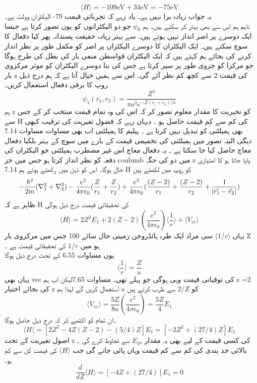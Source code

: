 \[\langle H \rangle =-109 \text{eV}+34 \text{eV}=-75\text{eV}\]
یہ جواب زیادہ برا نہیں ہے۔
یاد رہے کہ تجرباتی قیمت 79- الیکٹران وولٹ ہے۔\\
تاہم ہم اس سے بھی بہتر کر سکتے ہیں۔
ہم
\(\psi_{0}\)
جو دو الیکٹرانوں کو یوں تصور کرتا ہے جیسا ایک دوسرے پر اصر انداز نہیں ہوتے ہیں۔
سے بہتر زیادہ حقیقت پسندانہ پھر کیا دفعال کا سوچ سکتے ہیں۔
ایک الیکٹران کا دوسرے الیکٹران پر اصر کو مکمل طور پر نظر انداز کرنے کی بجائے ہم کہتے ہیں کہ ایک الیکٹران قواسطن منفی بار کی بطل کی طرح ہوگا جو مرکزا کو جزوی طور پر سپر کرتا ہے جس کی بنا دوسرے الیکٹران کو موثر مرکزوی بار z کی قیمت 2 سے کچھ کم نظر آئے گی۔ اس سے ہمیں خیال آتا ہے کہ ہم درج ذیل روپ کا برقی دفعال استعمال کریں۔
\[\psi_{1}(r_{1},r_{2})=\frac{Z^{3}}{\pi a^{3}e^{-Z(r_{1}+r_{2})/a}}\]
ہم z کو تخیریت کا مقدار معلوم تصور کر کہ اس کی وہ تمام قیمت منتخب کر کے جس سے H کی کم سے کم قیمت حاصل ہو ۔
دیہان رہے کہ فضول تغیریت کی ترقیب کبھی بھی ہمیلٹنی کو تبدیل نہیں کرتا ہے ۔
ہیلیم کا ہمیلٹنی اب بھی مساوات 
مساوات 7.14
دیگی البتہ
تصور میں ہمیلٹنی کی تخمیمی قیمت کے بارے میں سوچ کے بہتر بلکیا دفعال معاج حاصل کیا جا سکتا ہے ۔
یہ دفعال معاج اس غیر مضطرب ہمیلٹنی جو الیکٹران کی دفعہ کو نظر انداز کرتا ہو جس میں جز coulumb میں دو کی جگہ z پایا جاتا ہو کا امتیازی حال ہوگا۔
اس کو ذہن میں رکھتے ہوئے ہم 7.14 H کو روپ میں لکھتے ہیں 
\[-\frac{\hbar^{2}}{2m}(\nabla_{1}^{2}+\nabla_{2}^{2})-\frac{e^{2}}{4\pi\epsilon_{0}}(\frac{Z}{r_{1}}+\frac{Z}{r_{2}})+\frac{e^{2}}{4\pi\epsilon_{0}}(\frac{(Z-2)}{r_{1}}+\frac{(Z-2)}{r_{2}}+\frac{1}{\abs{\vec{r_{1}}-\vec{r}_{2}}})\]
ظاہر ہے کہ H کی تحقیقاتی قیمت درج ذیل ہوگی 
\[\langle H \rangle = 2Z^{2}E_{1}+2(Z-2)(\frac{e^{2}}{4\pi\epsilon_{0}})\langle \frac{1}{r}\rangle + \langle V_{ee} \rangle \]
یہاں
\(\langle 1/r \rangle \) 
سی مراد ایک ظرہ ہائڈروجن زمینی حال سائے 100 جس میں مرکزوی بار 
Z
 ہو میں
\(1/r\)
کی تحقیقاتی قیمت ہے ۔\\
یوں مساوات 6.55 کے تحت درج ذیل ہوگا 
\[\langle \frac{1}{r} \rangle = \frac{Z}{a}\]
یہاں بھی vee کی توقیاتی قیمت وہی ہوگی جو پہلے تھی۔
مساوات 7.65لیکن اب ہم z =2 کی بجائے اختیار z استعمال کریں گے لہذا ہم a کو 
\(2/Z\)
 سے ظرب کرتے ہیں 
 \[\langle V_{ee} \rangle =\frac{5Z}{8a}(\frac{e^{2}}{4\pi\epsilon_{0}})=\frac{5Z}{4}E_{1}\]
 ۔ان تمام کو اکٹھے کر کہ درج ذیل حاصل ہوگا 
 \[\langle H \langle =[2Z^{2}-4Z(Z-2)-(5/4)Z]E_{1}=[-2Z^{2}+(27/4)Z]E_{1}\]
اصول تغیریت کے تحت z کی کسی قیمت کے لیے بھی یہ مقدار 
\(E_{gs}\)
سے تجاوظ کرے گی ۔\\
بالائی حد بندی کی کم سے کم قیمت وہاں پائی جانے گی جب
 \(\langle H \rangle  \)
  کی قیمت کن سے کم ہو۔\\
\[\frac{d}{dZ}\langle H \rangle =[-4Z+(27/4)]E_{1}=0\]
